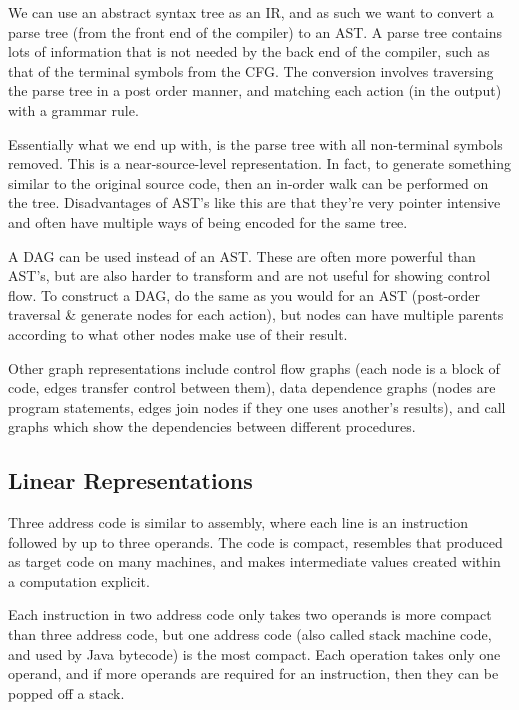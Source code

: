 We can use an abstract syntax tree as an IR, and as such we want to
convert a parse tree (from the front end of the compiler) to an AST. A
parse tree contains lots of information that is not needed by the back
end of the compiler, such as that of the terminal symbols from the
CFG. The conversion involves traversing the parse tree in a post order
manner, and matching each action (in the output) with a grammar rule.


Essentially what we end up with, is the parse tree with all
non-terminal symbols removed. This is a near-source-level
representation. In fact, to generate something similar to the original
source code, then an in-order walk can be performed on the
tree. Disadvantages of AST's like this are that they're very pointer
intensive and often have multiple ways of being encoded for the same
tree.

A DAG can be used instead of an AST. These are often more powerful
than AST's, but are also harder to transform and are not useful for
showing control flow. To construct a DAG, do the same as you would for
an AST (post-order traversal \& generate nodes for each action), but
nodes can have multiple parents according to what other nodes make use
of their result.

Other graph representations include control flow graphs (each node is
a block of code, edges transfer control between them), data dependence
graphs (nodes are program statements, edges join nodes if they one
uses another's results), and call graphs which show the dependencies
between different procedures.


\subsection{Linear Representations}

Three address code is similar to assembly, where each line is an
instruction followed by up to three operands. The code is compact,
resembles that produced as target code on many machines, and makes
intermediate values created within a computation explicit.

Each instruction in two address code only takes two operands is more
compact than three address code, but one address code (also called
stack machine code, and used by Java bytecode) is the most
compact. Each operation takes only one operand, and if more operands
are required for an instruction, then they can be popped off a stack.

